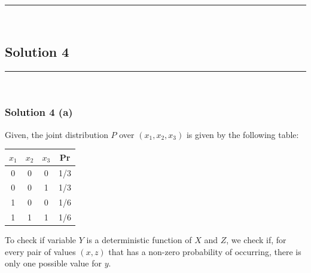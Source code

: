 \documentclass{article}
\begin{document}
\noindent\rule{\textwidth}{0.4pt}\\

\newpage

\subsection*{Solution 4}
\noindent\rule{\textwidth}{0.4pt}\\
\subsubsection*{Solution 4 (a)}
\begin{flushleft}
    Given, the joint distribution $P$ over $(x_1, x_2, x_3)$ is given by the following table:
\end{flushleft}
\begin{center}
\begin{tabular}{c|c|c|c}
$x_1$ & $x_2$ & $x_3$ & Pr \\\hline
0 & 0 & 0 & 1/3 \\
0 & 0 & 1 & 1/3 \\
1 & 0 & 0 & 1/6 \\
1 & 1 & 1 & 1/6
\end{tabular}
\end{center}
\begin{flushleft}
    To check if variable $Y$ is a deterministic function of $X$ and $Z$, we check if, for every pair of values $(x, z)$ that has a non-zero probability of occurring, there is only one possible value for $y$.
\end{flushleft}
\end{document}
